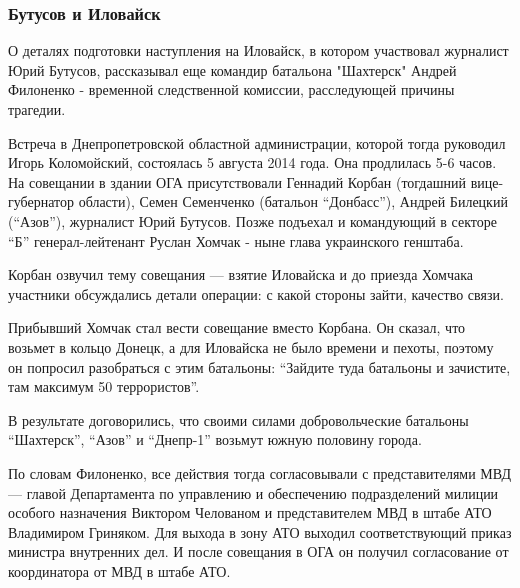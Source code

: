  
 
 

\subsubsection{Бутусов и Иловайск}
\label{sec:18_11_2020.news.ua.strana.1.battle_ljusenka_jura_ilovajskii.butusov_i_ilovajsk}

О деталях подготовки наступления на Иловайск, в котором участвовал журналист
Юрий Бутусов, рассказывал еще командир батальона "Шахтерск" Андрей
Филоненко
- временной следственной комиссии, расследующей причины трагедии.

Встреча в Днепропетровской областной администрации, которой тогда
руководил Игорь Коломойский, состоялась 5 августа 2014 года. Она
продлилась 5-6 часов. На совещании в здании ОГА присутствовали Геннадий
Корбан (тогдашний вице-губернатор области), Семен Семенченко (батальон
\enquote{Донбасс}), Андрей Билецкий (\enquote{Азов}), журналист Юрий Бутусов. Позже
подъехал и командующий в секторе \enquote{Б} генерал-лейтенант Руслан Хомчак -
ныне глава украинского генштаба.

Корбан озвучил тему совещания --- взятие Иловайска и до приезда Хомчака
участники обсуждались детали операции: с какой стороны зайти, качество
связи.

Прибывший Хомчак стал вести совещание вместо Корбана. Он сказал, что
возьмет в кольцо Донецк, а для Иловайска не было времени и пехоты, поэтому
он попросил разобраться с этим батальоны: \enquote{Зайдите туда батальоны и
зачистите, там максимум 50 террористов}.

В результате договорились, что своими силами добровольческие батальоны
\enquote{Шахтерск}, \enquote{Азов} и \enquote{Днепр-1} возьмут южную половину города.

По словам Филоненко, все действия тогда согласовывали с представителями
МВД --- главой Департамента по управлению и обеспечению подразделений
милиции особого назначения Виктором Челованом и представителем МВД в штабе
АТО Владимиром Гриняком. Для выхода в зону АТО выходил соответствующий
приказ министра внутренних дел. И после совещания в ОГА он получил
согласование от координатора от МВД в штабе АТО.

